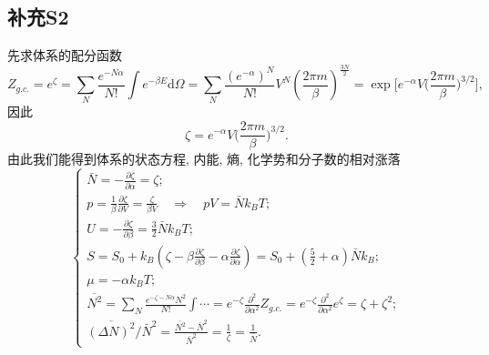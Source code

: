 \documentclass[letterpaper, 10pt]{article}
\newcommand{\dd}{\mathrm{d}}
\begin{document}
\subsection{补充S2}
先求体系的配分函数
\[ Z_{g.c.} = e^{\zeta} = \sum_{N} \frac{e^{-N\alpha}}{N!} \int e^{-\beta E} \dd \Omega = 
\sum_{N} \frac{(e^{-\alpha})^N}{N!} V^N \left( \frac{2\pi m}{\beta} \right)^{\frac{3N}{2}} =
\exp\bigg[ e^{-\alpha} V \Big( \frac{2\pi m}{\beta} \Big)^{3/2} \bigg], \]
因此
\[ \zeta = e^{-\alpha} V \Big( \frac{2\pi m}{\beta} \Big)^{3/2}. \]
由此我们能得到体系的状态方程, 内能, 熵, 化学势和分子数的相对涨落
\[\begin{cases}
\bar{N} = - \frac{\partial \zeta}{\partial \alpha} = \zeta;\\
p = \frac{1}{\beta} \frac{\partial \zeta}{\partial V} = \frac{\zeta}{\beta V} \quad{} \Rightarrow \quad{} pV = \bar{N} k_{B} T;\\
U = - \frac{\partial \zeta}{\partial \beta} = \frac{3}{2} \bar{N} k_{B} T;\\
S = S_{0} + k_{B} \left( \zeta - \beta \frac{\partial \zeta}{\partial \beta} - \alpha \frac{\partial \zeta}{\partial \alpha} \right) = S_{0} + \left( \frac{5}{2} + \alpha \right) \bar{N} k_{B};\\
\mu = -\alpha k_{B} T;\\
\overline{N^2} = \sum_{N} \frac{e^{-\zeta-N\alpha}N^2}{N!} \int \cdots = e^{-\zeta} \frac{\partial^2}{\partial \alpha^2} Z_{g.c.} = 
e^{-\zeta} \frac{\partial^2}{\partial \alpha^2} e^{\zeta} = \zeta + \zeta^2;\\
\overline{(\Delta N)^2} / \bar{N}^2 = \frac{\overline{N^2}-\bar{N}^2}{\bar{N}^2} = \frac{1}{\zeta} = \frac{1}{\bar{N}}.
\end{cases}\]
\end{document}
